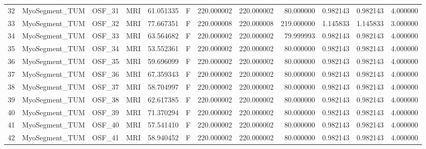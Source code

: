 \begin{tabular}{llllrlrrrrrr}
32     &  MyoSegment\_TUM &       OSF\_31 &                MRI &  61.051335 &        F &       220.000002 &    220.000002 &   80.000000 &               0.982143 &            0.982143 &          4.000000 \\
33     &  MyoSegment\_TUM &       OSF\_32 &                MRI &  77.667351 &        F &       220.000008 &    220.000008 &  219.000000 &               1.145833 &            1.145833 &          3.000000 \\
34     &  MyoSegment\_TUM &       OSF\_33 &                MRI &  63.564682 &        F &       220.000002 &    220.000002 &   79.999993 &               0.982143 &            0.982143 &          4.000000 \\
35     &  MyoSegment\_TUM &       OSF\_34 &                MRI &  53.552361 &        F &       220.000002 &    220.000002 &   80.000000 &               0.982143 &            0.982143 &          4.000000 \\
36     &  MyoSegment\_TUM &       OSF\_35 &                MRI &  59.696099 &        F &       220.000002 &    220.000002 &   80.000000 &               0.982143 &            0.982143 &          4.000000 \\
37     &  MyoSegment\_TUM &       OSF\_36 &                MRI &  67.359343 &        F &       220.000002 &    220.000002 &   80.000000 &               0.982143 &            0.982143 &          4.000000 \\
38     &  MyoSegment\_TUM &       OSF\_37 &                MRI &  58.704997 &        F &       220.000002 &    220.000002 &   80.000000 &               0.982143 &            0.982143 &          4.000000 \\
39     &  MyoSegment\_TUM &       OSF\_38 &                MRI &  62.617385 &        F &       220.000002 &    220.000002 &   80.000000 &               0.982143 &            0.982143 &          4.000000 \\
40     &  MyoSegment\_TUM &       OSF\_39 &                MRI &  71.370294 &        F &       220.000002 &    220.000002 &   80.000000 &               0.982143 &            0.982143 &          4.000000 \\
41     &  MyoSegment\_TUM &       OSF\_40 &                MRI &  57.541410 &        F &       220.000002 &    220.000002 &   80.000000 &               0.982143 &            0.982143 &          4.000000 \\
42     &  MyoSegment\_TUM &       OSF\_41 &                MRI &  58.940452 &        F &       220.000002 &    220.000002 &   80.000000 &               0.982143 &            0.982143 &          4.000000 \\

\end{tabular}
